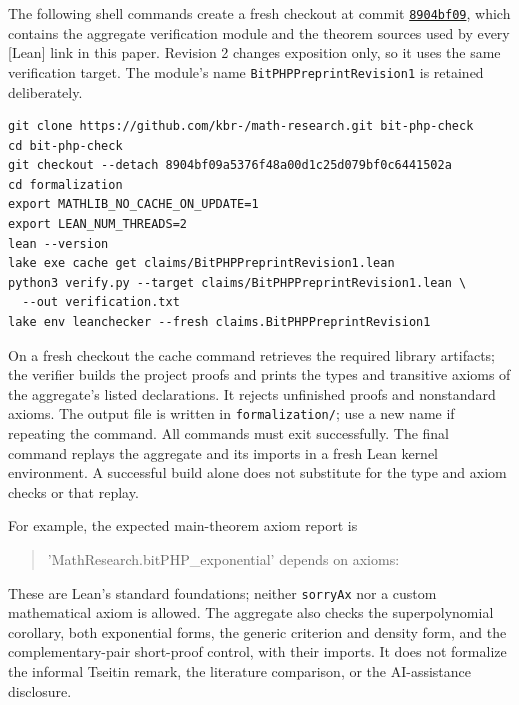 The following shell commands create a fresh checkout at commit
\href{https://github.com/kbr-/math-research/tree/8904bf09a5376f48a00d1c25d079bf0c6441502a}
{\texttt{8904bf09}}, which contains the aggregate verification module and the
theorem sources used by every [Lean] link in this paper. Revision 2 changes
exposition only, so it uses the same verification target. The module's name
\texttt{BitPHPPreprintRevision1} is retained deliberately.

\begingroup\small
\begin{verbatim}
git clone https://github.com/kbr-/math-research.git bit-php-check
cd bit-php-check
git checkout --detach 8904bf09a5376f48a00d1c25d079bf0c6441502a
cd formalization
export MATHLIB_NO_CACHE_ON_UPDATE=1
export LEAN_NUM_THREADS=2
lean --version
lake exe cache get claims/BitPHPPreprintRevision1.lean
python3 verify.py --target claims/BitPHPPreprintRevision1.lean \
  --out verification.txt
lake env leanchecker --fresh claims.BitPHPPreprintRevision1
\end{verbatim}
\endgroup

On a fresh checkout the cache command retrieves the required library artifacts;
the verifier builds the project proofs and prints the types and transitive
axioms of the aggregate's listed declarations. It rejects unfinished proofs
and nonstandard axioms. The output file is written in \texttt{formalization/}; use
a new name if repeating the command. All commands must exit successfully.
The final command replays the aggregate and its imports in a fresh Lean kernel
environment. A successful build alone does not substitute for the type and
axiom checks or that replay.

For example, the expected main-theorem axiom report is
\begin{quote}\small\ttfamily
'MathResearch.bitPHP\_exponential' depends on axioms:\par
[propext, Classical.choice, Quot.sound]
\end{quote}
These are Lean's standard foundations; neither \texttt{sorryAx} nor a
custom mathematical axiom is allowed. The aggregate also checks the
superpolynomial corollary, both exponential forms, the generic criterion
and density form, and the complementary-pair short-proof control, with their
imports. It does not formalize the informal Tseitin remark, the literature
comparison, or the AI-assistance disclosure.
